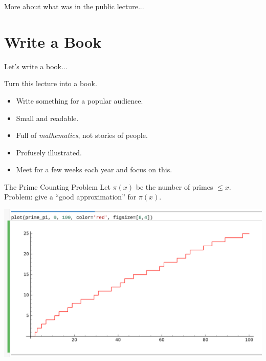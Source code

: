 \documentclass{beamer}
\begin{document}
\begin{frame}{More about what was in the public lecture...}

\end{frame}


\section{Write a Book}

\begin{frame}{Let's write a book...}
  \begin{block}{Turn this lecture into a book.}

    \begin{itemize}
      \item Write something for a popular audience.
      \item Small and readable.
      \item Full of {\em mathematics}, not stories of people.
      \item Profusely illustrated.
      \item Meet for a few weeks each year and focus on this.
    \end{itemize}
  \end{block}
\end{frame}

\begin{frame}{The Prime Counting Problem}
  Let $\pi(x)$ be the number of primes $\leq x$.\\
  Problem: give a ``good approximation'' for $\pi(x)$.
  \vfill

  \includegraphics[width=.98\textwidth]{pics/prime-pi-100.png}

\end{frame}
\end{document}
